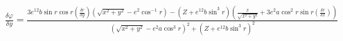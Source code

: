 \documentclass{standalone}
\begin{document}
    $\frac{\delta \varphi}{\delta y} = \frac{ 3e^{12} b{\sin r}{\cos r} (\frac{\delta r}{\delta y})(\sqrt{x^2+y^2} -
    e^2 {\cos^{-1} r}) - (Z + e^{12}b{\sin^3 r}) (\frac{x}{\sqrt{x^2+y^2}} + 3e^2 a {\cos^2 r}{\sin r} (\frac{\delta r}{\delta x}) ) }{(\sqrt{x^2+y^2}-e^2 a {\cos^3 r})^2 + (Z + e^12 b {\sin^3 r})^2}$
\end{document}
